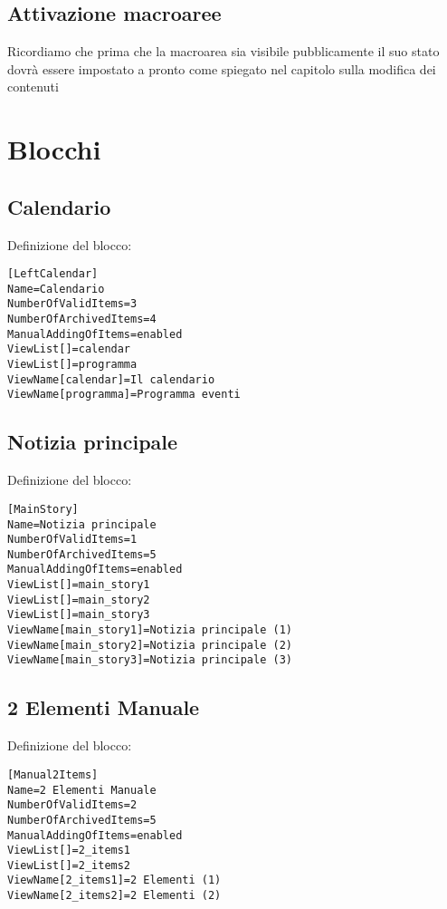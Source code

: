\subsection{Attivazione macroaree}
Ricordiamo che prima che la macroarea sia visibile pubblicamente il suo stato dovrà essere impostato a pronto come spiegato nel capitolo sulla modifica dei contenuti

\section{Blocchi}

\subsection{Calendario}

Definizione del blocco:

\begin{verbatim}
[LeftCalendar]
Name=Calendario
NumberOfValidItems=3
NumberOfArchivedItems=4
ManualAddingOfItems=enabled
ViewList[]=calendar
ViewList[]=programma
ViewName[calendar]=Il calendario
ViewName[programma]=Programma eventi
\end{verbatim}


\subsection{Notizia principale}

Definizione del blocco:
\begin{verbatim}
[MainStory]
Name=Notizia principale
NumberOfValidItems=1
NumberOfArchivedItems=5
ManualAddingOfItems=enabled
ViewList[]=main_story1
ViewList[]=main_story2
ViewList[]=main_story3
ViewName[main_story1]=Notizia principale (1)
ViewName[main_story2]=Notizia principale (2)
ViewName[main_story3]=Notizia principale (3)
\end{verbatim}



\subsection{2 Elementi Manuale}


Definizione del blocco:

\begin{verbatim}
[Manual2Items]
Name=2 Elementi Manuale
NumberOfValidItems=2
NumberOfArchivedItems=5
ManualAddingOfItems=enabled
ViewList[]=2_items1
ViewList[]=2_items2
ViewName[2_items1]=2 Elementi (1)
ViewName[2_items2]=2 Elementi (2) 
\end{verbatim}
